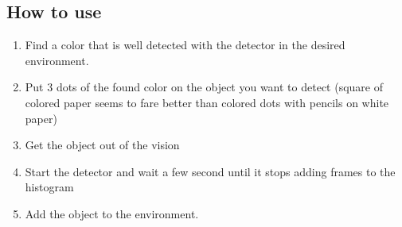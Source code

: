 \subsection{How to use}
    \begin{enumerate}
        \item Find a color that is well detected with the detector in the desired environment.
        \item Put 3 dots of the found color on the object you want to detect (square of colored paper seems to fare better than colored dots with pencils on white paper)
        \item Get the object out of the vision
        \item Start the detector and wait a few second until it stops adding frames to the histogram
        \item Add the object to the environment. 
    \end{enumerate}

 

